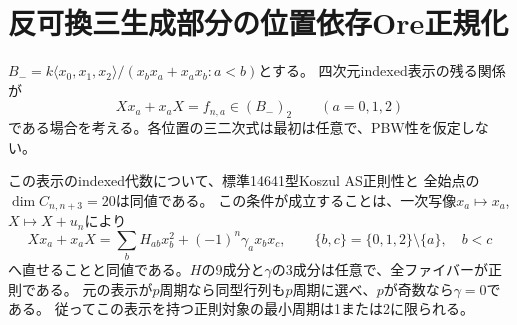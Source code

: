 \section{反可換三生成部分の位置依存Ore正規化}
\label{sec:anticommutative-ore}
$B_-=k\langle x_0,x_1,x_2\rangle/(x_bx_a+x_ax_b:a<b)$とする。
四次元indexed表示の残る関係が
\[
 Xx_a+x_aX=f_{n,a}\in(B_-)_2\qquad(a=0,1,2)
\]
である場合を考える。各位置の三二次式は最初は任意で、PBW性を仮定しない。

\begin{theorem}[反可換Ore表示の三次判定と正規形]\label{thm:indexed-anticommutative-ore}
この表示のindexed代数について、標準14641型Koszul AS正則性と
全始点の$\dim C_{n,n+3}=20$は同値である。
この条件が成立することは、一次写像$x_a\mapsto x_a$, $X\mapsto X+u_n$により
\begin{equation}\label{eq:anti-ore-normal}
 Xx_a+x_aX=\sum_b H_{ab}x_b^2+(-1)^n\gamma_a x_bx_c,
 \qquad \{b,c\}=\{0,1,2\}\setminus\{a\},\quad b<c
\end{equation}
へ直せることと同値である。$H$の9成分と$\gamma$の3成分は任意で、全ファイバーが正則である。
元の表示が$p$周期なら同型行列も$p$周期に選べ、$p$が奇数なら$\gamma=0$である。
従ってこの表示を持つ正則対象の最小周期は1または2に限られる。
\end{theorem}
